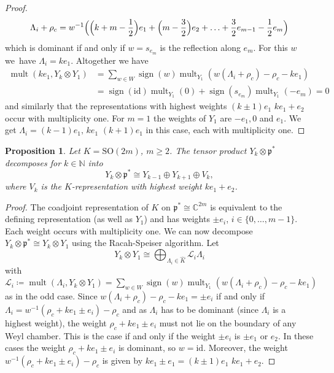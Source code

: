 \documentclass[JEP,XML,SOM,NoFloatCountersInSection,Unicode,published]{cedram}
\newtheorem{proposition}[theorem]{Proposition}
\theoremstyle{definition}
\newcommand{\mc}[1]{\ensuremath{\mathcal{#1}}}
\newcommand{\mf}[1]{\ensuremath{\mathfrak{#1}}}
\newcommand{\on}[1]{\ensuremath{\operatorname{#1}}}
\newcommand{\rhoc}{\ensuremath{\rho_c}}
\newcommand{\C}{\ensuremath{\mathbb{C}}}
\newcommand{\SO}[1]{\ensuremath{\mathrm{SO}(#1)}}
\begin{document}
\begin{proof}
\[
\Lambda_i+\rhoc=w^{-1}\Bigl(\Bigl(k+m-\frac12\Bigr) e_1+\Bigl(m-\frac32\Bigr) e_2+\ldots+\frac32 e_{m-1}-\frac12 e_m\Bigr)
\]
which is dominant if and only if $w=s_{ e_m}$ is the reflection along $ e_m$. For this $w$ we~have $\Lambda_i=k e_1$. Altogether we have
\begin{align*}
\on{mult}(k e_1,Y_k\otimes Y_1)&=\sum_{w\in W}\on{sign}(w)\on{mult}_{Y_1}(w(\Lambda_i+\rhoc)-\rhoc-k e_1)\\
&=\on{sign}(\mathrm{id})\on{mult}_{Y_1}(0)+\on{sign}(s_{ e_m})\on{mult}_{Y_1}(- e_m)=0
\end{align*}
and similarly that the representations with highest weights $(k\pm1) e_1$ \resp $k e_1+ e_2$ occur with multiplicity one. For $m=1$ the weights of $Y_1$ are $-e_1,0$ and $e_1$. We get $\Lambda_i=(k-1)e_1,\, ke_1$ \resp $(k+1)e_1$ in this case, each with multiplicity one.
\end{proof}

\begin{proposition}\label{prop:tensor_decomp_even}
Let $K=\SO{2m}$, $m\geq2$. The tensor product $Y_k\otimes\mf p^*$ decomposes for $k\in\mathbb{N}$ into
\[
Y_k\otimes\mf p^*\cong Y_{k-1}\oplus Y_{k+1}\oplus V_k,
\]
where $V_k$ is the $K$-representation with highest weight $k e_1+ e_2$.
\end{proposition}

\begin{proof}
The coadjoint representation of $K$ on $\mf p^*\cong \C^{2m}$ is equivalent to the defining representation (as well as $Y_1$) and has weights $\pm e_i$, $i\in\{0,\ldots,m-1\}$. Each weight occurs with multiplicity one. We can now decompose $Y_k\otimes\mf p^*\cong Y_k\otimes Y_1$ using the Racah-Speiser algorithm. Let
\[
Y_k\otimes Y_1\cong\bigoplus_{\Lambda_i\in\hat K}\mathcal{L}_i\Lambda_i
\]
with $\mc{L}_i\coloneqq\on{mult}(\Lambda_i, Y_k\otimes Y_1)=\sum_{w\in W}\on{sign}(w)\on{mult}_{Y_1}(w(\Lambda_i+\rhoc)-\rhoc-k e_1)$ as in the odd case. Since
$ w(\Lambda_i+\rhoc)-\rhoc-k e_1=\pm e_i$ if and only if $\Lambda_i=w^{-1}(\rhoc+k e_1\pm e_i)-\rhoc$ and as $\Lambda_i$
has to be dominant (since $\Lambda_i$ is a highest weight), the weight $\rhoc+k e_1\pm e_i$ must not lie on the boundary of any Weyl chamber. This is the case if and only if the weight $\pm e_i$ is $\pm e_1$ or $ e_2$. In these cases the weight $\rhoc+k e_1\pm e_i$ is dominant, so $w=\mathrm{id}$. Moreover, the weight $w^{-1}(\rhoc+k e_1\pm e_i)-\rhoc$ is given by $k e_1\pm e_1=(k\pm1) e_1$ \resp $k e_1+ e_2$.
\end{proof}
\end{document}
